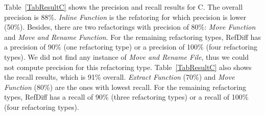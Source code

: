Table~\ref{TabResultC} shows the precision and recall results for C. The overall precision is 88\%. \textit{Inline Function} is the refatoring for which precision is lower (50\%). Besides, there are two refactorings with precision of 80\%: \textit{Move Function} and \textit{Move and Rename Function}. For the remaining refactoring types, RefDiff has a precision of 90\% (one refactoring type) or a precision of 100\% (four refactoring types).
We did not find any instance of \textit{Move and Rename File}, thus we could not compute precision for this refactoring type.
Table~\ref{TabResultC} also shows the recall results, which is 91\% overall.
\textit{Extract Function} (70\%) and \textit{Move Function} (80\%) are the ones with lowest recall.
For the remaining refactoring types, RefDiff has a recall of 90\% (three refactoring types) or a recall of 100\% (four refactoring types).




